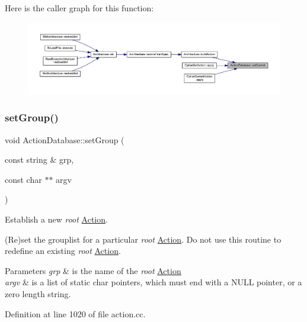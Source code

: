 Here is the caller graph for this function\+:
\nopagebreak
\begin{figure}[H]
\begin{center}
\leavevmode
\includegraphics[width=350pt]{class_action_database_a19e09431e4e66936090715ab8afe774b_icgraph}
\end{center}
\end{figure}
\mbox{\label{class_action_database_adcd5e496a007d4d18456da556c755a42}} 
\subsubsection{\texorpdfstring{setGroup()}{setGroup()}}
{\footnotesize\ttfamily void Action\+Database\+::set\+Group (\begin{DoxyParamCaption}\item[{const string \&}]{grp,  }\item[{const char $\ast$$\ast$}]{argv }\end{DoxyParamCaption})}



Establish a new {\itshape root} \mbox{\hyperlink{class_action}{Action}}. 

(Re)set the grouplist for a particular {\itshape root} \mbox{\hyperlink{class_action}{Action}}. Do not use this routine to redefine an existing {\itshape root} \mbox{\hyperlink{class_action}{Action}}. 
\begin{DoxyParams}{Parameters}
{\em grp} & is the name of the {\itshape root} \mbox{\hyperlink{class_action}{Action}} \\
\hline
{\em argv} & is a list of static char pointers, which must end with a N\+U\+LL pointer, or a zero length string. \\
\hline
\end{DoxyParams}


Definition at line 1020 of file action.\+cc.

